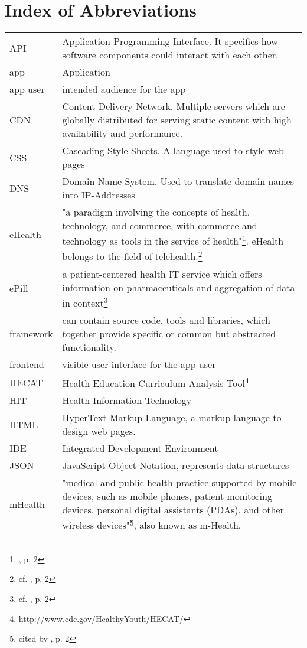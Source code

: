 \section*{Index of Abbreviations}
\begin{longtable}{@{}p{}@{}p{}@{}}
    API & Application Programming Interface. It specifies how software components could interact with each other. \\
    app & Application \\
    app user & intended audience for the app \\
    CDN & Content Delivery Network. Multiple servers which are globally distributed for serving static content with high availability and performance. \\
    CSS & Cascading Style Sheets. A language used to style web pages \\
    DNS & Domain Name System. Used to translate domain names into IP-Addresses \\
    eHealth & "a paradigm involving the concepts of health, technology, and commerce, with commerce and technology as tools in the service of health"\footnote{\cite{MartinezPerez.2013}, p. 2}. eHealth belongs to the field of telehealth.\footnote{cf. \cite{MartinezPerez.2013}, p. 2} \\
    ePill & a patient-centered health IT service which offers information on pharmaceuticals and aggregation of data in context\footnote{cf. \cite{Dehling.2012b}, p. 2} \\
    framework & can contain source code, tools and libraries, which together provide specific or common but abstracted functionality. \\
    frontend & visible user interface for the app user \\
    HECAT & Health Education Curriculum Analysis Tool\footnote{\url{http://www.cdc.gov/HealthyYouth/HECAT/}} \\
    HIT & Health Information Technology \\
    HTML & HyperText Markup Language, a markup language to design web pages. \\
    IDE & Integrated Development Environment \\
    JSON & JavaScript Object Notation, represents data structures \\
    mHealth & "medical and public health practice supported by mobile devices, such as mobile phones, patient monitoring devices, personal digital assistants (PDAs), and other wireless devices"\footnote{\cite{WorldHealthOrganization.2011} cited by \cite{MartinezPerez.2013}, p. 2}, also known as m-Health. \\

\end{longtable}
